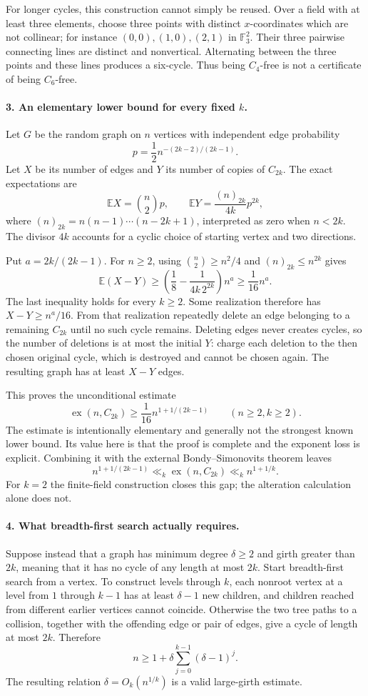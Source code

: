 \documentclass[11pt]{article}
\begin{document}
For longer cycles, this construction cannot simply be reused. Over a field with at least three elements, choose three points with distinct $x$-coordinates which are not collinear; for instance $(0,0),(1,0),(2,1)$ in $\mathbb F_3^2$. Their three pairwise connecting lines are distinct and nonvertical. Alternating between the three points and these lines produces a six-cycle. Thus being $C_4$-free is not a certificate of being $C_6$-free.

\paragraph{3. An elementary lower bound for every fixed $k$.}
Let $G$ be the random graph on $n$ vertices with independent edge probability
\[
 p=\frac12 n^{-(2k-2)/(2k-1)}.
\]
Let $X$ be its number of edges and $Y$ its number of copies of $C_{2k}$. The exact expectations are
\[
 \mathbb E X=\binom n2p,\qquad
 \mathbb E Y=\frac{(n)_{2k}}{4k}p^{2k},
\]
where $(n)_{2k}=n(n-1)\cdots(n-2k+1)$, interpreted as zero when $n<2k$. The divisor $4k$ accounts for a cyclic choice of starting vertex and two directions.

Put $a=2k/(2k-1)$. For $n\ge2$, using $\binom n2\ge n^2/4$ and $(n)_{2k}\le n^{2k}$ gives
\[
 \mathbb E(X-Y)
 \ge\left(\frac18-\frac{1}{4k\,2^{2k}}\right)n^a
 \ge\frac1{16}n^a.
\]
The last inequality holds for every $k\ge2$. Some realization therefore has $X-Y\ge n^a/16$. From that realization repeatedly delete an edge belonging to a remaining $C_{2k}$ until no such cycle remains. Deleting edges never creates cycles, so the number of deletions is at most the initial $Y$: charge each deletion to the then chosen original cycle, which is destroyed and cannot be chosen again. The resulting graph has at least $X-Y$ edges.

This proves the unconditional estimate
\[
 \operatorname{ex}(n,C_{2k})\ge\frac1{16}n^{1+1/(2k-1)}
 \qquad(n\ge2,k\ge2).
\]
The estimate is intentionally elementary and generally not the strongest known lower bound. Its value here is that the proof is complete and the exponent loss is explicit. Combining it with the external Bondy--Simonovits theorem leaves
\[
 n^{1+1/(2k-1)}\ll_k\operatorname{ex}(n,C_{2k})
 \ll_k n^{1+1/k}.
\]
For $k=2$ the finite-field construction closes this gap; the alteration calculation alone does not.

\paragraph{4. What breadth-first search actually requires.}
Suppose instead that a graph has minimum degree $\delta\ge2$ and girth greater than $2k$, meaning that it has no cycle of any length at most $2k$. Start breadth-first search from a vertex. To construct levels through $k$, each nonroot vertex at a level from $1$ through $k-1$ has at least $\delta-1$ new children, and children reached from different earlier vertices cannot coincide. Otherwise the two tree paths to a collision, together with the offending edge or pair of edges, give a cycle of length at most $2k$. Therefore
\[
 n\ge1+\delta\sum_{j=0}^{k-1}(\delta-1)^j.
\]
The resulting relation $\delta=O_k(n^{1/k})$ is a valid large-girth estimate.
\end{document}
